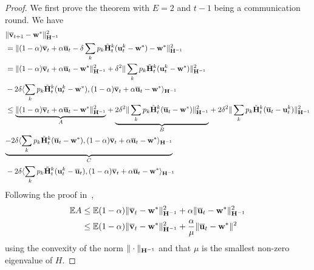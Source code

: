 \begin{proof}
	We first prove the theorem with $E=2$ and $t-1$ being a communication
	round. We have 
	\begin{align*}
	& \|\overline{\mathbf{v}}_{t+1}-\mathbf{w}^{\ast}\|_{{\mathbf{H}}^{-1}}^{2}\\
	& =\|(1-\alpha){\overline{\mathbf{v}}}_{t}+\alpha{\overline{\mathbf{u}}}_{t}-\delta\sum_{k}p_{k}\tilde{{\mathbf{H}}}_{t}^{k}({\mathbf{u}}_{t}^{k}-{\mathbf{w}}^{\ast})-{\mathbf{w}}^{\ast}\|_{{\mathbf{H}}^{-1}}^{2}\\
	& =\|(1-\alpha){\overline{\mathbf{v}}}_{t}+\alpha{\overline{\mathbf{u}}}_{t}-{\mathbf{w}}^{\ast}\|_{{\mathbf{H}}^{-1}}^{2}+\delta^{2}\|\sum_{k}p_{k}\tilde{{\mathbf{H}}}_{t}^{k}({\mathbf{u}}_{t}^{k}-{\mathbf{w}}^{\ast})\|_{{\mathbf{H}}^{-1}}^{2}\\
	& -2\delta\langle\sum_{k}p_{k}\tilde{{\mathbf{H}}}_{t}^{k}({\mathbf{u}}_{t}^{k}-{\mathbf{w}}^{\ast}),(1-\alpha){\overline{\mathbf{v}}}_{t}+\alpha{\overline{\mathbf{u}}}_{t}-{\mathbf{w}}^{\ast}\rangle_{{\mathbf{H}}^{-1}}\\
	& \leq\underset{A}{\underbrace{\|(1-\alpha){\overline{\mathbf{v}}}_{t}+\alpha{\overline{\mathbf{u}}}_{t}-{\mathbf{w}}^{\ast}\|_{{\mathbf{H}}^{-1}}^{2}}}+\underset{B}{\underbrace{2\delta^{2}\|\sum_{k}p_{k}\tilde{{\mathbf{H}}}_{t}^{k}({\overline{\mathbf{u}}}_{t}-{\mathbf{w}}^{\ast})\|_{{\mathbf{H}}^{-1}}^{2}}}+2\delta^{2}\|\sum_{k}p_{k}\tilde{{\mathbf{H}}}_{t}^{k}({\overline{\mathbf{u}}}_{t}-{\mathbf{u}}_{t}^{k})\|_{{\mathbf{H}}^{-1}}^{2}\\
	& \underset{C}{\underbrace{-2\delta\langle\sum_{k}p_{k}\tilde{{\mathbf{H}}}_{t}^{k}({\overline{\mathbf{u}}}_{t}-{\mathbf{w}}^{\ast}),(1-\alpha){\overline{\mathbf{v}}}_{t}+\alpha{\overline{\mathbf{u}}}_{t}-{\mathbf{w}}^{\ast}\rangle_{{\mathbf{H}}^{-1}}}}\\
	& -2\delta\langle\sum_{k}p_{k}\tilde{{\mathbf{H}}}_{t}^{k}({\mathbf{u}}_{t}^{k}-{\overline{\mathbf{u}}}_{t}),(1-\alpha){\overline{\mathbf{v}}}_{t}+\alpha{\overline{\mathbf{u}}}_{t}-{\mathbf{w}}^{\ast}\rangle_{{\mathbf{H}}^{-1}}
	\end{align*}
	Following the proof in~\cite{liu2018accelerating}, 
	\begin{align*}
	\mathbb{E}A & \leq\mathbb{E}(1-\alpha)\|{\overline{\mathbf{v}}}_{t}-{\mathbf{w}}^{\ast}\|_{{\mathbf{H}}^{-1}}^{2}+\alpha\|{\overline{\mathbf{u}}}_{t}-{\mathbf{w}}^{\ast}\|_{{\mathbf{H}}^{-1}}^{2}\\
	& \leq\mathbb{E}(1-\alpha)\|{\overline{\mathbf{v}}}_{t}-{\mathbf{w}}^{\ast}\|_{{\mathbf{H}}^{-1}}^{2}+\frac{\alpha}{\mu}\|{\overline{\mathbf{u}}}_{t}-{\mathbf{w}}^{\ast}\|^{2}
	\end{align*}
	using the convexity of the norm $\|\cdot\|_{{\mathbf{H}}^{-1}}$ and that $\mu$
	is the smallest non-zero eigenvalue of $H$. 
	

\end{proof}
